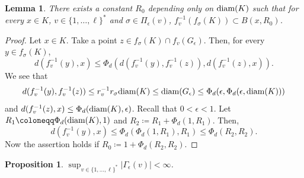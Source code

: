 \documentclass[a4paper, reqno, 11pt]{amsart}
\newtheorem{Lem}[Thm]{Lemma}
\newtheorem{Prop}[Thm]{Proposition}
\theoremstyle{definition}
\begin{document}
\begin{Lem}\label{lem:inverse-contained}
There exists a constant $R_0$ depending only on $\textup{diam}(K)$ such that for every $x \in K$, $v \in \{1,\dots, \ell\}^{*}$ and $\sigma \in \Pi_{\epsilon}(v)$, 
$f_v^{-1}\left(f_{\sigma}(K)\right) \subset B(x,R_0)$. 
\end{Lem}

\begin{proof}
Let $x \in K$. 
Take a point $z \in f_{\sigma}(K) \cap f_{v}(G_{\epsilon})$. 
Then, for every $y \in f_{\sigma}(K)$, 
\[ d(f_v^{-1}(y), x) \le \Phi_d \left( d(f_v^{-1}(y), f_v^{-1}(z)),  d(f_v^{-1}(z), x)\right). \]
We see that 
\[ d(f_v^{-1}(y), f_v^{-1}(z)) \le r_v^{-1} r_{\sigma} \textup{diam}(K) \le \textup{diam}(G_{\epsilon}) \le \Phi_d (\epsilon, \Phi_d (\epsilon, \textup{diam}(K))) \]
and $d(f_v^{-1}(z), x) \le \Phi_d (\textup{diam}(K), \epsilon)$. 
Recall that $0 < \epsilon < 1$. 
Let $R_1 \coloneqq \Phi_d (\textup{diam}(K), 1)$ and $R_2 \coloneqq R_1 + \Phi_d (1, R_1)$. 
Then, 
\[ d(f_v^{-1}(y), x) \le \Phi_d \left( \Phi_d (1, R_1),  R_1 \right) \le \Phi_d (R_2, R_2). \]
Now the assertion holds if $R_0 \coloneqq 1 + \Phi_d (R_2, R_2)$. 
\end{proof}

\begin{Prop}
$\sup_{v \in \{1, \dots, \ell\}^{*}} \left|\Gamma_{\epsilon}(v) \right| < \infty$.
\end{Prop}
\end{document}
